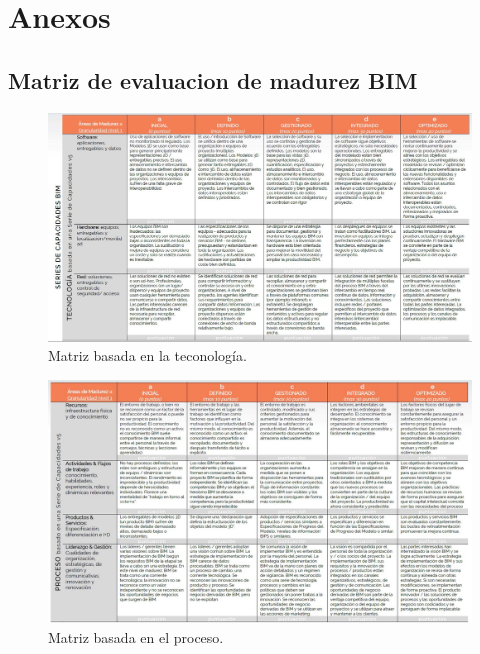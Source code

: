 \chapter*{Anexos}

\section{Matriz de evaluacion de madurez BIM}

\begin{figure}[H]
    \centering
    \includegraphics[width=1\linewidth]{images/matriz-madurez-1.jpeg}
    \caption{Matriz basada en la teconología.}
\end{figure}

\begin{figure}[H]
    \centering
    \includegraphics[width=1\linewidth]{images/matriz-madurez-2.jpeg}
    \caption{Matriz basada en el proceso.}
\end{figure}


